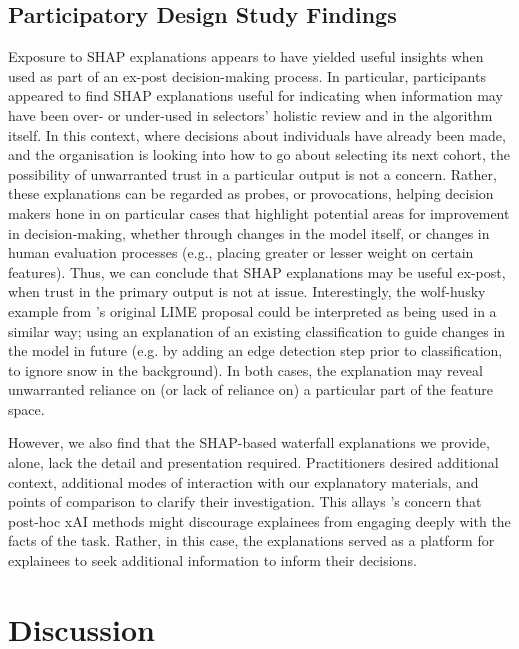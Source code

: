 \subsection{Participatory Design Study Findings}\label{ssec:cs_discussion}
Exposure to SHAP explanations appears to have yielded useful insights when used as part of an ex-post decision-making process. In particular, participants appeared to find SHAP explanations useful for indicating when information may have been over- or under-used in selectors' holistic review and in the algorithm itself. In this context, where decisions about individuals have already been made, and the organisation is looking into how to go about selecting its next cohort, the possibility of unwarranted trust in a particular output is not a concern. Rather, these explanations can be regarded as probes, or provocations, helping decision makers hone in on particular cases that highlight potential areas for improvement in decision-making, whether through changes in the model itself, or changes in human evaluation processes (e.g., placing greater or lesser weight on certain features). Thus, we can conclude that SHAP explanations may be useful ex-post, when trust in the primary output is not at issue. Interestingly, the wolf-husky example from \textcite{ribeiro_why_2016}'s original LIME proposal could be interpreted as being used in a similar way; using an explanation of an existing classification to guide changes in the model in future (e.g. by adding an edge detection step prior to classification, to ignore snow in the background). In both cases, the explanation may reveal unwarranted reliance on (or lack of reliance on) a particular part of the feature space.

However, we also find that the SHAP-based waterfall explanations we provide, alone, lack the detail and presentation required. Practitioners desired additional context, additional modes of interaction with our explanatory materials, and points of comparison to clarify their investigation. This allays \textcite{miller_explainable_2023}'s concern that post-hoc xAI methods might discourage explainees from engaging deeply with the facts of the task. Rather, in this case, the explanations served as a platform for explainees to seek additional information to inform their decisions.

\section{Discussion}
